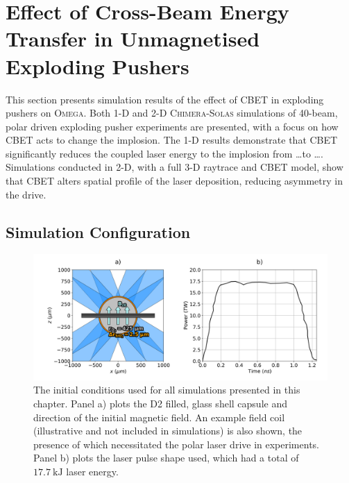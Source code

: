 \section{Effect of Cross-Beam Energy Transfer in Unmagnetised Exploding Pushers}%
\label{sec:Res2_CBET_expl}

This section presents simulation results of the effect of \ac{CBET} in exploding pushers on \textsc{Omega}.
Both 1-D and 2-D \textsc{Chimera}-\textsc{Solas} simulations of 40-beam, polar driven exploding pusher experiments are presented, with a focus on how \ac{CBET} acts to change the implosion.
The 1-D results demonstrate that \ac{CBET} significantly reduces the coupled laser energy to the implosion from \dots to \dots.
Simulations conducted in 2-D, with a full 3-D raytrace and \ac{CBET} model, show that \ac{CBET} alters spatial profile of the laser deposition, reducing asymmetry in the drive.



\subsection{Simulation Configuration}%
\label{sec:Res2_simconfig}


\begin{figure}[t!]
    \includegraphics[width=\linewidth]{Results2/Images/magpdd_diagram_pulse.png}
    \centering
    \caption{The initial conditions used for all simulations presented in this chapter.
    Panel a) plots the D2 filled, glass shell capsule and direction of the initial magnetic field.
    An example field coil (illustrative and not included in simulations) is also shown, the presence of which necessitated the polar laser drive in experiments.
    Panel b) plots the laser pulse shape used, which had a total of $17.7\ \text{kJ}$ laser energy.}%
    \label{fig:Res2_simconfig}
\end{figure}


